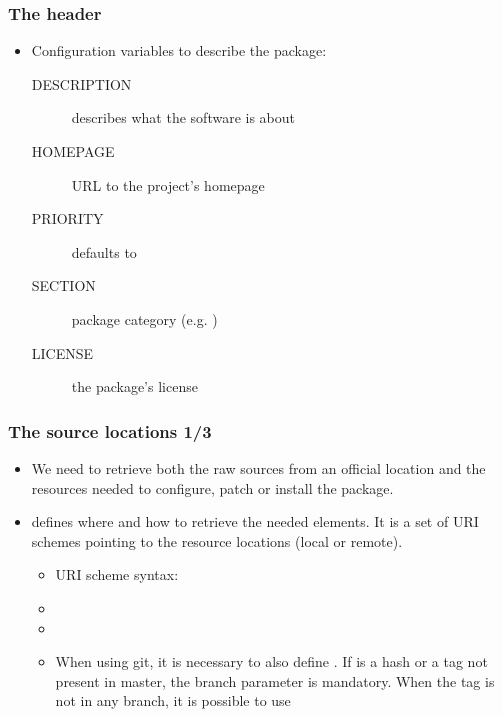 \begin{frame}
  \frametitle{The header}
  \begin{itemize}
    \item Configuration variables to describe the package:
      \begin{description}
        \item[DESCRIPTION] describes what the software is about
        \item[HOMEPAGE] URL to the project's homepage
        \item[PRIORITY] defaults to 
        \item[SECTION] package category (e.g. )
        \item[LICENSE] the package's license
      \end{description}
  \end{itemize}
\end{frame}

\begin{frame}
  \frametitle{The source locations 1/3}
  \begin{itemize}
    \item We need to retrieve both the raw sources from an official
      location and the resources needed to configure, patch or install
      the package.
    \item {} defines where and how to retrieve the
      needed elements. It is a set of URI schemes pointing to the
      resource locations (local or remote).
      \begin{itemize}
        \item URI scheme syntax: 
        \item {}
        \item
        \item
          When using git, it is necessary to also define
          . If  is a hash or a tag not
          present in master, the branch parameter is mandatory. When
          the tag is not in any branch, it is possible to use
      \end{itemize}
  \end{itemize}
\end{frame}

